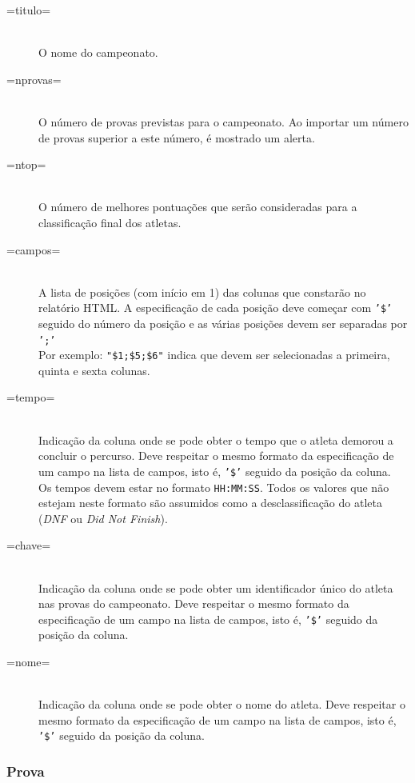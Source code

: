 \documentclass[11pt, a4paper, oneside]{article}
\begin{document}
\begin{description}
\item[=titulo=] \hfill \\
	O nome do campeonato.
\item[=nprovas=] \hfill \\
	O número de provas previstas para o campeonato. Ao importar um número de provas superior a este número, é mostrado um alerta.
\item[=ntop=] \hfill \\
	O número de melhores pontuações que serão consideradas para a classificação final dos atletas.
\item[=campos=] \hfill \\
	A lista de posições (com início em 1) das colunas que constarão no relatório HTML. A especificação de cada posição deve começar com \texttt{'\$'} seguido do número da posição e as várias posições devem ser separadas por \texttt{';'}\\
	Por exemplo: \texttt{"\$1;\$5;\$6"} indica que devem ser selecionadas a primeira, quinta e sexta colunas.
\item[=tempo=] \hfill \\
	Indicação da coluna onde se pode obter o tempo que o atleta demorou a concluir o percurso. Deve respeitar o mesmo formato da especificação de um campo na lista de campos, isto é, \texttt{'\$'} seguido da posição da coluna.\\
	Os tempos devem estar no formato \texttt{HH:MM:SS}. Todos os valores que não estejam neste formato são assumidos como a desclassificação do atleta (\emph{DNF} ou \emph{Did Not Finish}).
\item[=chave=] \hfill \\
	Indicação da coluna onde se pode obter um identificador único do atleta nas provas do campeonato. Deve respeitar o mesmo formato da especificação de um campo na lista de campos, isto é, \texttt{'\$'} seguido da posição da coluna.
\item[=nome=] \hfill \\
	Indicação da coluna onde se pode obter o nome do atleta. Deve respeitar o mesmo formato da especificação de um campo na lista de campos, isto é, \texttt{'\$'} seguido da posição da coluna.
\end{description}

\subsubsection{Prova}
\end{document}
